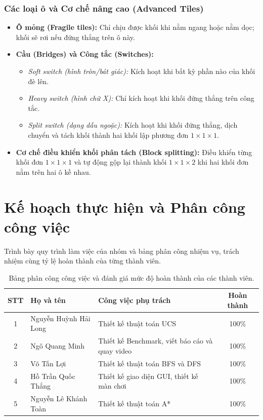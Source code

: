 \documentclass[12pt,a4paper]{article}
\begin{document}
\subsubsection{Các loại ô và Cơ chế nâng cao (Advanced Tiles)}
\begin{itemize}
    \item \textbf{Ô mỏng (Fragile tiles):} Chỉ chịu được khối khi nằm ngang hoặc nằm dọc; khối sẽ rơi nếu đứng thẳng trên ô này.
    \item \textbf{Cầu (Bridges) và Công tắc (Switches):}
    \begin{itemize}
        \item \emph{Soft switch (hình tròn/bát giác):} Kích hoạt khi bất kỳ phần nào của khối đè lên.
        \item \emph{Heavy switch (hình chữ X):} Chỉ kích hoạt khi khối đứng thẳng trên công tắc.
        \item \emph{Split switch (dạng dấu ngoặc):} Kích hoạt khi khối đứng thẳng, dịch chuyển và tách khối thành hai khối lập phương đơn $1 \times 1 \times 1$.
    \end{itemize}
    \item \textbf{Cơ chế điều khiển khối phân tách (Block splitting):} Điều khiển từng khối đơn $1 \times 1 \times 1$ và tự động gộp lại thành khối $1 \times 1 \times 2$ khi hai khối đơn nằm trên hai ô kề nhau.
\end{itemize}

\section{Kế hoạch thực hiện và Phân công công việc}
Trình bày quy trình làm việc của nhóm và bảng phân công nhiệm vụ, trách nhiệm cùng tỷ lệ hoàn thành của từng thành viên.

\begin{table}[H]
\centering
\renewcommand{\arraystretch}{1.3}
\begin{tabular*}{\textwidth}{@{\extracolsep{\fill}}clp{}c@{}}
\toprule
\textbf{STT} & \textbf{Họ và tên} & \textbf{Công việc phụ trách} & \textbf{Hoàn thành} \\
\midrule
1 & Nguyễn Huỳnh Hải Long & Thiết kế thuật toán UCS & 100\% \\
2 & Ngô Quang Minh        & Thiết kế Benchmark, viết báo cáo và quay video & 100\% \\
3 & Võ Tấn Lợi            & Thiết kế thuật toán BFS và DFS & 100\% \\
4 & Hồ Trần Quốc Thắng    & Thiết kế giao diện GUI, thiết kế màn chơi & 100\% \\
5 & Nguyễn Lê Khánh Toàn  & Thiết kế thuật toán A* & 100\% \\
\bottomrule
\end{tabular*}
\caption{Bảng phân công công việc và đánh giá mức độ hoàn thành của các thành viên.}
\label{tab:task_distribution}
\end{table}
\end{document}
